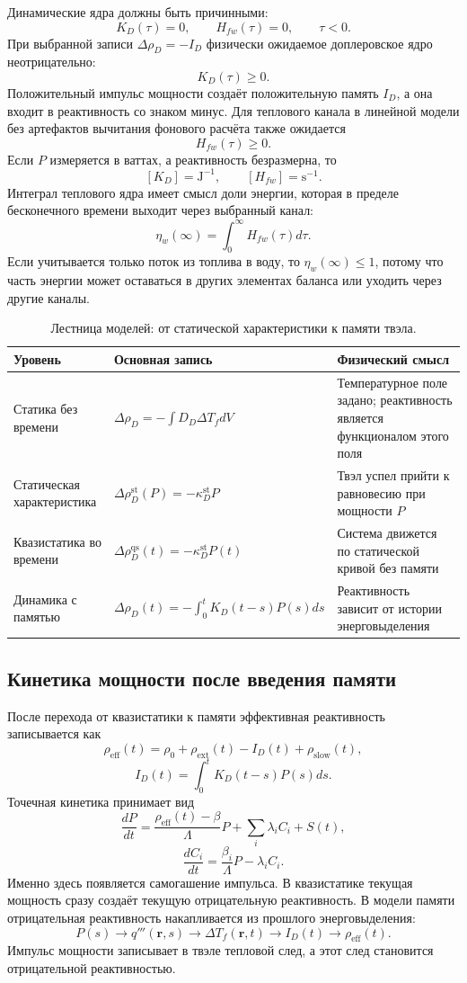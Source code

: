 \documentclass[12pt]{article}
\begin{document}
Динамические ядра должны быть причинными:
\[
K_D(\tau)=0,
\qquad
H_{fw}(\tau)=0,
\qquad
\tau<0.
\]
При выбранной записи \(\Delta\rho_D=-I_D\) физически ожидаемое доплеровское ядро неотрицательно:
\[
K_D(\tau)\ge0.
\]
Положительный импульс мощности создаёт положительную память \(I_D\), а она входит в реактивность со знаком минус. Для теплового канала в линейной модели без артефактов вычитания фонового расчёта также ожидается
\[
H_{fw}(\tau)\ge0.
\]
Если \(P\) измеряется в ваттах, а реактивность безразмерна, то
\[
[K_D]=\mathrm{J}^{-1},
\qquad
[H_{fw}]=\mathrm{s}^{-1}.
\]
Интеграл теплового ядра имеет смысл доли энергии, которая в пределе бесконечного времени выходит через выбранный канал:
\[
\eta_w(\infty)=\int_0^\infty H_{fw}(\tau)d\tau.
\]
Если учитывается только поток из топлива в воду, то \(\eta_w(\infty)\le1\), потому что часть энергии может оставаться в других элементах баланса или уходить через другие каналы.

\begin{table}[H]
\centering
\caption{Лестница моделей: от статической характеристики к памяти твэла.}
\label{tab:static_to_memory_ladder}
\begin{tabular}{|>{\centering\arraybackslash}p{3.0cm}|p{5.2cm}|p{5.4cm}|}
\hline
Уровень & Основная запись & Физический смысл\\
\hline
Статика без времени & \(\Delta\rho_D=-\int D_D\Delta T_f dV\) & Температурное поле задано; реактивность является функционалом этого поля\\
\hline
Статическая характеристика & \(\Delta\rho_D^{\mathrm{st}}(P)=-\kappa_D^{\mathrm{st}}P\) & Твэл успел прийти к равновесию при мощности \(P\)\\
\hline
Квазистатика во времени & \(\Delta\rho_D^{\mathrm{qs}}(t)=-\kappa_D^{\mathrm{st}}P(t)\) & Система движется по статической кривой без памяти\\
\hline
Динамика с памятью & \(\Delta\rho_D(t)=-\int_0^tK_D(t-s)P(s)ds\) & Реактивность зависит от истории энерговыделения\\
\hline
\end{tabular}
\end{table}

\subsection{Кинетика мощности после введения памяти}

После перехода от квазистатики к памяти эффективная реактивность записывается как
\[
\rho_{\mathrm{eff}}(t)
=
\rho_0+
\rho_{\mathrm{ext}}(t)-I_D(t)+\rho_{\mathrm{slow}}(t),
\]
\[
I_D(t)=\int_0^tK_D(t-s)P(s)ds.
\]
Точечная кинетика принимает вид
\[
\frac{dP}{dt}
=
\frac{\rho_{\mathrm{eff}}(t)-\beta}{\Lambda}P
+
\sum_i\lambda_iC_i+S(t),
\]
\[
\frac{dC_i}{dt}
=
\frac{\beta_i}{\Lambda}P-
\lambda_iC_i.
\]
Именно здесь появляется самогашение импульса. В квазистатике текущая мощность сразу создаёт текущую отрицательную реактивность. В модели памяти отрицательная реактивность накапливается из прошлого энерговыделения:
\[
P(s)
\rightarrow
q'''(\mathbf r,s)
\rightarrow
\Delta T_f(\mathbf r,t)
\rightarrow
I_D(t)
\rightarrow
\rho_{\mathrm{eff}}(t).
\]
Импульс мощности записывает в твэле тепловой след, а этот след становится отрицательной реактивностью.
\end{document}

